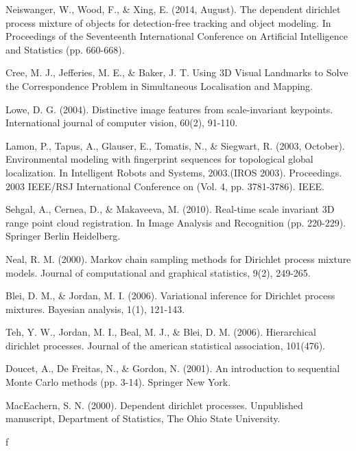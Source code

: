 \documentclass[twoside,hidelinks]{article}
\begin{document}
\begin{thebibliography}{9}
\newblock Neiswanger, W., Wood, F., \& Xing, E. (2014, August). The dependent dirichlet process mixture of objects for detection-free tracking and object modeling. In Proceedings of the Seventeenth International Conference on Artificial Intelligence and Statistics (pp. 660-668).

\newblock Cree, M. J., Jefferies, M. E., \& Baker, J. T. Using 3D Visual Landmarks to Solve the Correspondence Problem in Simultaneous Localisation and Mapping.

\newblock Lowe, D. G. (2004). Distinctive image features from scale-invariant keypoints. International journal of computer vision, 60(2), 91-110.

\newblock Lamon, P., Tapus, A., Glauser, E., Tomatis, N., \& Siegwart, R. (2003, October). Environmental modeling with fingerprint sequences for topological global localization. In Intelligent Robots and Systems, 2003.(IROS 2003). Proceedings. 2003 IEEE/RSJ International Conference on (Vol. 4, pp. 3781-3786). IEEE.


\newblock Sehgal, A., Cernea, D., \& Makaveeva, M. (2010). Real-time scale invariant 3D range point cloud registration. In Image Analysis and Recognition (pp. 220-229). Springer Berlin Heidelberg.

\newblock Neal, R. M. (2000). Markov chain sampling methods for Dirichlet process mixture models. Journal of computational and graphical statistics, 9(2), 249-265.

\newblock Blei, D. M., \& Jordan, M. I. (2006). Variational inference for Dirichlet process mixtures. Bayesian analysis, 1(1), 121-143.


\newblock Teh, Y. W., Jordan, M. I., Beal, M. J., \& Blei, D. M. (2006). Hierarchical dirichlet processes. Journal of the american statistical association, 101(476).

\newblock Doucet, A., De Freitas, N., \& Gordon, N. (2001). An introduction to sequential Monte Carlo methods (pp. 3-14). Springer New York.


\newblock MacEachern, S. N. (2000). Dependent dirichlet processes. Unpublished manuscript, Department of Statistics, The Ohio State University.

f

\end{thebibliography}

\end{document}
